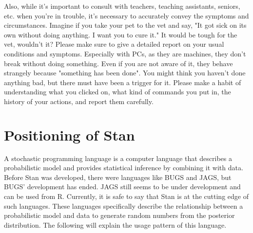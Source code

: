 \documentclass{ltjsbook}
\begin{document}
Also, while it's important to consult with teachers, teaching assistants, seniors, etc. when you're in trouble, it's necessary to accurately convey the symptoms and circumstances. Imagine if you take your pet to the vet and say, "It got sick on its own without doing anything. I want you to cure it." It would be tough for the vet, wouldn't it? Please make sure to give a detailed report on your usual conditions and symptoms. Especially with PCs, as they are machines, they don't break without doing something. Even if you are not aware of it, they behave strangely because "something has been done". You might think you haven't done anything bad, but there must have been a trigger for it. Please make a habit of understanding what you clicked on, what kind of commands you put in, the history of your actions, and report them carefully.

\section{Positioning of Stan}

A stochastic programming language is a computer language that describes a probabilistic model and provides statistical inference by combining it with data. Before Stan was developed, there were languages like BUGS and JAGS, but BUGS' development has ended. JAGS still seems to be under development and can be used from R. Currently, it is safe to say that Stan is at the cutting edge of such languages. These languages specifically describe the relationship between a probabilistic model and data to generate random numbers from the posterior distribution. The following will explain the usage pattern of this language.
\end{document}

